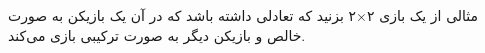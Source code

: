 مثالی از یک بازی ۲×۲ بزنید که تعادلی داشته باشد که در آن یک بازیکن به صورت خالص و بازیکن دیگر به صورت ترکیبی بازی می‌کند.